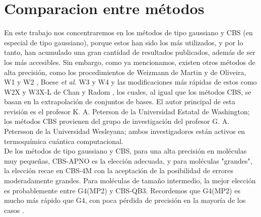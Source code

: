 \section{Comparacion entre métodos} 
En este trabajo nos concentraremos en los métodos de tipo gaussiano y CBS (en especial de tipo gaussiano), porque estos han sido los más utilizados, y por lo tanto, han acumulado una gran cantidad de resultados publicados, además de ser los más accesibles. Sin embargo, como ya mencionamos, existen otros métodos de alta precisión, como los procedimientos de Weizmann de Martin y de Oliveira, W1 y W2 \cite{Martin1999},  Boese \textit{et al.} W3 y W4 \cite{Boese2004} y las modificaciones más rápidas de estos como W2X y W3X-L de Chan y Radom \cite{Chan2015}, los cuales, al igual que los métodos CBS, se basan en la extrapolación de conjuntos de bases. El autor principal de esta revisión es el profesor K. A. Peterson de la Universidad Estatal de Washington; los métodos CBS provienen del grupo de investigación del profesor G. A. Petersson de la Universidad Wesleyana; ambos investigadores están activos en termoquímica cuántica computacional.\\

De los métodos de tipo gaussiano y CBS, para una alta precisión en moléculas muy pequeñas, CBS-APNO es la elección adecuada, y para moléculas "grandes", la elección recae en CBS-4M con la aceptación de la posibilidad de errores moderadamente grandes. Para moléculas de tamaño intermedio, la mejor elección es probablemente entre G4(MP2) y CBS-QB3. Recordemos que G4(MP2) es mucho más rápido que G4, con poca pérdida de precisión en la mayoría de los casos \cite{Lewars2016}.\\

